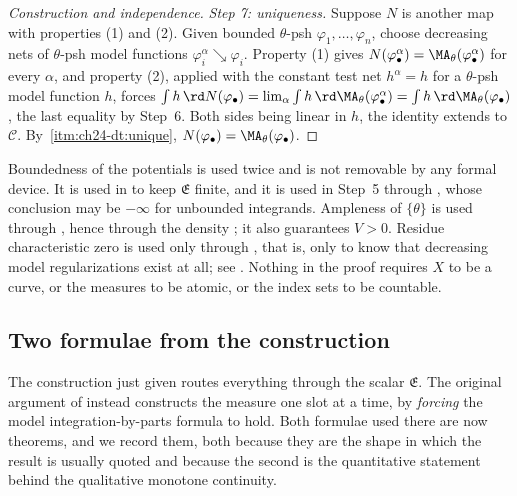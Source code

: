 \begin{proof}[Construction and independence]
\emph{Step 7: uniqueness.}  Suppose \(N\) is another map with properties (1)
and (2).  Given bounded \(\theta\)-psh \(\varphi_1,\ldots,\varphi_n\),
choose decreasing nets of \(\theta\)-psh model functions
\(\varphi_i^\alpha\searrow\varphi_i\).  Property (1) gives
\(N(\varphi^\alpha_\bullet)=\MA_\theta(\varphi^\alpha_\bullet)\) for every
\(\alpha\), and property (2), applied with the constant test net
\(h^\alpha=h\) for a \(\theta\)-psh model function \(h\), forces
\(\int h\,\rd N(\varphi_\bullet)=\lim_\alpha\int h\,
\rd\MA_\theta(\varphi^\alpha_\bullet)
=\int h\,\rd\MA_\theta(\varphi_\bullet)\), the last equality by Step~6.
Both sides being linear in \(h\), the identity extends to \(\mathcal C\).  By
\,\cref{itm:ch24-dt:unique},
\(N(\varphi_\bullet)=\MA_\theta(\varphi_\bullet)\).
\end{proof}

\begin{remark}
\label{rem:ch24-extension-audit}
Boundedness of the potentials is used twice and is not removable by any
formal device.  It is used in  to keep
\(\mathfrak E\) finite, and it is used in Step~5 through
, whose conclusion may be \(-\infty\) for
unbounded integrands.  Ampleness of \(\{\theta\}\) is used through
, hence through the density
; it also guarantees \(V>0\).  Residue
characteristic zero is used only through
, that is, only to know that
decreasing model regularizations exist at all; see .
Nothing in the proof requires \(X\) to be a curve, or the measures to be
atomic, or the index sets to be countable.
\end{remark}

\subsection{Two formulae from the construction}
\label{sec:ch24-two-formulae}

The construction just given routes everything through the scalar
\(\mathfrak E\).  The original argument of \cite[\S3]{BFJ15} instead
constructs the measure one slot at a time, by \emph{forcing} the model
integration-by-parts formula to hold.  Both formulae used there are now
theorems, and we record them, both because they are the shape in which the
result is usually quoted and because the second is the quantitative
statement behind the qualitative monotone continuity.

